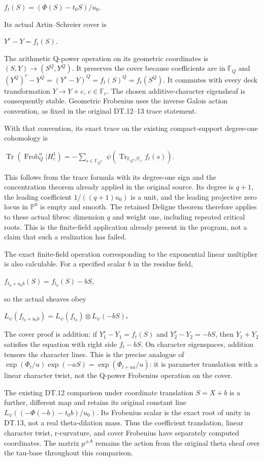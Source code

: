 \documentclass{article}
\begin{document}
\(f_t(S)=(\Phi(S)-t_0S)/u_0\).

Its actual Artin--Schreier cover is

\(Y^r-Y=f_t(S)\).

The arithmetic Q-power operation on its geometric coordinates is \((S,Y)\to (S^Q,Y^Q)\). It preserves the cover because coefficients are in \(\mathbb F_Q\) and \((Y^Q)^r-Y^Q=(Y^r-Y)^Q=f_t(S)^Q=f_t(S^Q)\). It commutes with every deck transformation \(Y\to Y+c\), \(c\in\mathbb F_r\). The chosen additive-character eigensheaf is consequently stable. Geometric Frobenius uses the inverse Galois action convention, as fixed in the original DT.12--13 trace statement.

With that convention, its exact trace on the existing compact-support degree-one cohomology is

\(\operatorname{Tr}(\operatorname{Frob}_Q^n|H_c^1)=-\sum_{s\in\mathbb F_{Q^n}}\) \(\psi(\operatorname{Tr}_{\mathbb F_{Q^n}/\mathbb F_r}f_t(s))\).

This follows from the trace formula with its degree-one sign and the concentration theorem already applied in the original source. Its degree is \(q+1\), the leading coefficient \(1/((q+1)u_0)\) is a unit, and the leading projective zero locus in \(\mathbb P^0\) is empty and smooth. The retained Deligne theorem therefore applies to these actual fibres: dimension \(q\) and weight one, including repeated critical roots. This is the finite-field application already present in the program, not a claim that such a realization has failed.

The exact finite-field operation corresponding to the exponential linear multiplier is also calculable. For a specified scalar \(b\) in the residue field,

\(f_{t_0+u_0 b}(S)=f_{t_0}(S)-bS\),

so the actual sheaves obey

\textbf{\(L_\psi(f_{t_0+u_0b})=L_\psi(f_{t_0}) \otimes L_\psi(-bS)\).}

The cover proof is addition: if \(Y_1^r-Y_1=f_t(S)\) and \(Y_2^r-Y_2=-bS\), then \(Y_1+Y_2\) satisfies the equation with right side \(f_t-bS\). On character eigenspaces, addition tensors the character lines. This is the precise analogue of \(\exp(\Phi_t/u)\exp(-aS)=\exp(\Phi_{t+ua}/u)\): it is parameter translation with a linear character twist, not the Q-power Frobenius operation on the cover.

The existing DT.12 comparison under coordinate translation \(S=X+b\) is a further, different map and retains its original constant line \(L_\psi((-\Phi(-b)-t_0b)/u_0)\). Its Frobenius scalar is the exact root of unity in DT.13, not a real theta-dilation mass. Thus the coefficient translation, linear character twist, r-curvature, and cover Frobenius have separately computed coordinates. The matrix \(p^{\pm A}\) remains the action from the original theta sheaf over the tau-base throughout this comparison.
\end{document}
